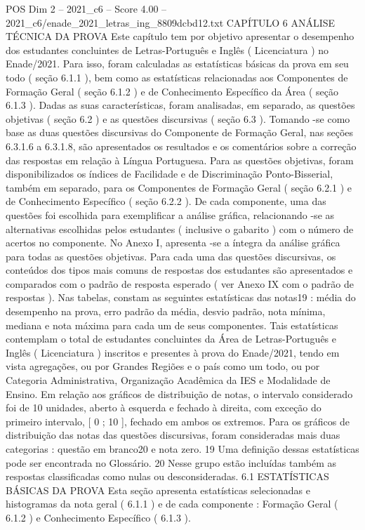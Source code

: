\begin{textsample}{POS Dim 2 – 2021\_c6 – Score 4.00 – 2021\_c6/enade\_2021\_letras\_ing\_8809dcbd12.txt}  \label{ex:f2_pos_174}
CAPÍTULO 6 ANÁLISE TÉCNICA DA PROVA Este capítulo tem por objetivo apresentar o desempenho dos estudantes concluintes de Letras-Português e Inglês ( Licenciatura ) no Enade/2021.
Para isso, foram calculadas as estatísticas básicas da prova em seu todo ( seção 6.1.1 ), bem como as estatísticas relacionadas aos Componentes de Formação Geral ( seção 6.1.2 ) e de Conhecimento Específico da Área ( seção 6.1.3 ).
Dadas as suas características, foram analisadas, em separado, as questões objetivas ( seção 6.2 ) e as questões discursivas ( seção 6.3 ).
Tomando -se como base as duas questões discursivas do Componente de Formação Geral, nas seções 6.3.1.6 a 6.3.1.8, são apresentados os resultados e os comentários sobre a correção das respostas em relação à Língua Portuguesa.
Para as questões objetivas, foram disponibilizados os índices de Facilidade e de Discriminação Ponto-Bisserial, também em separado, para os Componentes de Formação Geral ( seção 6.2.1 ) e de Conhecimento Específico ( seção 6.2.2 ).
De cada componente, uma das questões foi escolhida para exemplificar a análise gráfica, relacionando -se as alternativas escolhidas pelos estudantes ( inclusive o gabarito ) com o número de acertos no componente.
No Anexo I, apresenta -se a íntegra da análise gráfica para todas as questões objetivas.
Para cada uma das questões discursivas, os conteúdos dos tipos mais comuns de respostas dos estudantes são apresentados e comparados com o padrão de resposta esperado ( ver Anexo IX com o padrão de respostas ).
Nas tabelas, constam as seguintes estatísticas das notas19 : média do desempenho na prova, erro padrão da média, desvio padrão, nota mínima, mediana e nota máxima para cada um de seus componentes.
Tais estatísticas contemplam o total de estudantes concluintes da Área de Letras-Português e Inglês ( Licenciatura ) inscritos e presentes à prova do Enade/2021, tendo em vista agregações, ou por Grandes Regiões e o país como um todo, ou por Categoria Administrativa, Organização Acadêmica da IES e Modalidade de Ensino.
Em relação aos gráficos de distribuição de notas, o intervalo considerado foi de 10 unidades, aberto à esquerda e fechado à direita, com exceção do primeiro intervalo, [ 0 ; 10 ], fechado em ambos os extremos.
Para os gráficos de distribuição das notas das questões discursivas, foram consideradas mais duas categorias : questão em branco20 e nota zero. 19 Uma definição dessas estatísticas pode ser encontrada no Glossário. 20 Nesse grupo estão incluídas também as respostas classificadas como nulas ou desconsideradas. 6.1 ESTATÍSTICAS BÁSICAS DA PROVA Esta seção apresenta estatísticas selecionadas e histogramas da nota geral ( 6.1.1 ) e de cada componente : Formação Geral ( 6.1.2 ) e Conhecimento Específico ( 6.1.3 ).

\end{textsample}
